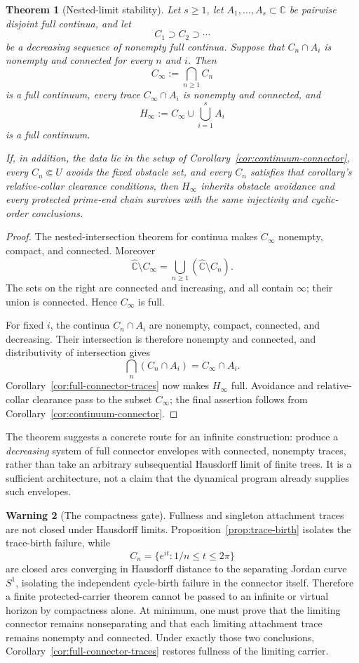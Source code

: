 \documentclass[11pt,reqno]{amsart}
\newtheorem{theorem}{Theorem}[section]
\theoremstyle{definition}
\newtheorem{warning}[theorem]{Warning}
\theoremstyle{remark}
\newcommand{\C}{\mathbb C}
\newcommand{\Chat}{\widehat{\mathbb C}}
\begin{document}
\begin{theorem}[Nested-limit stability]
\label{thm:nested-limit-stability}
Let $s\ge1$, let $A_1,\dots,A_s\subset\C$ be pairwise disjoint full
continua, and let
\[
 C_1\supset C_2\supset\cdots
\]
be a decreasing sequence of nonempty full continua.  Suppose that
$C_n\cap A_i$ is nonempty and connected for every $n$ and $i$.  Then
\[
 C_\infty:=\bigcap_{n\ge1}C_n
\]
is a full continuum, every trace $C_\infty\cap A_i$ is nonempty and
connected, and
\[
 H_\infty:=C_\infty\cup\bigcup_{i=1}^{s}A_i
\]
is a full continuum.

If, in addition, the data lie in the setup of
Corollary~\ref{cor:continuum-connector}, every $C_n\Subset U$ avoids the
fixed obstacle set, and every $C_n$ satisfies that corollary's
relative-collar clearance conditions, then $H_\infty$
inherits obstacle avoidance and every protected prime-end chain survives
with the same injectivity and cyclic-order conclusions.
\end{theorem}

\begin{proof}
The nested-intersection theorem for continua makes $C_\infty$ nonempty,
compact, and connected.  Moreover
\[
 \Chat\setminus C_\infty
 =
 \bigcup_{n\ge1}(\Chat\setminus C_n).
\]
The sets on the right are connected and increasing, and all contain
$\infty$; their union is connected.  Hence $C_\infty$ is full.

For fixed $i$, the continua $C_n\cap A_i$ are nonempty, compact, connected,
and decreasing.  Their intersection is therefore nonempty and connected,
and distributivity of intersection gives
\[
 \bigcap_n(C_n\cap A_i)=C_\infty\cap A_i.
\]
Corollary~\ref{cor:full-connector-traces} now makes $H_\infty$ full.
Avoidance and relative-collar clearance pass to the subset $C_\infty$;
the final assertion follows from
Corollary~\ref{cor:continuum-connector}.
\end{proof}

The theorem suggests a concrete route for an infinite construction:
produce a \emph{decreasing} system of full connector envelopes with
connected, nonempty traces, rather than take an arbitrary subsequential
Hausdorff limit of finite trees.  It is a sufficient architecture, not a
claim that the dynamical program already supplies such envelopes.

\begin{warning}[The compactness gate]
\label{warn:compactness-gate}
Fullness and singleton attachment traces are not closed under Hausdorff
limits.  Proposition~\ref{prop:trace-birth} isolates the trace-birth
failure, while
\[
C_n=\{e^{it}:1/n\le t\le2\pi\}
\]
are closed arcs converging in Hausdorff distance to the separating Jordan
curve $S^1$, isolating the independent cycle-birth failure in the connector
itself.  Therefore a
finite protected-carrier theorem cannot be passed to an infinite or virtual
horizon by compactness alone.  At minimum, one must prove that the limiting
connector remains nonseparating and that each limiting attachment trace
remains nonempty and connected.  Under exactly those two conclusions,
Corollary~\ref{cor:full-connector-traces} restores fullness of the limiting
carrier.
\end{warning}
\end{document}
